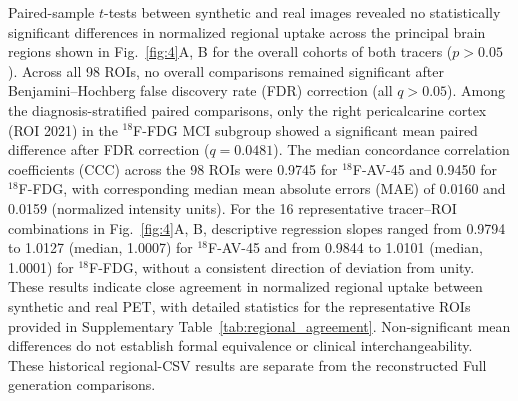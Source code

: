 Paired-sample $t$-tests between synthetic and real images revealed no statistically significant differences in normalized regional uptake across the principal brain regions shown in Fig.~\ref{fig:4}A, B for the overall cohorts of both tracers ($p>0.05$). Across all 98 ROIs, no overall comparisons remained significant after Benjamini--Hochberg false discovery rate (FDR) correction (all $q>0.05$). Among the diagnosis-stratified paired comparisons, only the right pericalcarine cortex (ROI 2021) in the $^{18}$F-FDG MCI subgroup showed a significant mean paired difference after FDR correction ($q=0.0481$). The median concordance correlation coefficients (CCC) across the 98 ROIs were 0.9745 for $^{18}$F-AV-45 and 0.9450 for $^{18}$F-FDG, with corresponding median mean absolute errors (MAE) of 0.0160 and 0.0159 (normalized intensity units). For the 16 representative tracer--ROI combinations in Fig.~\ref{fig:4}A, B, descriptive regression slopes ranged from 0.9794 to 1.0127 (median, 1.0007) for $^{18}$F-AV-45 and from 0.9844 to 1.0101 (median, 1.0001) for $^{18}$F-FDG, without a consistent direction of deviation from unity. These results indicate close agreement in normalized regional uptake between synthetic and real PET, with detailed statistics for the representative ROIs provided in Supplementary Table~\ref{tab:regional_agreement}. Non-significant mean differences do not establish formal equivalence or clinical interchangeability. These historical regional-CSV results are separate from the reconstructed Full generation comparisons.
